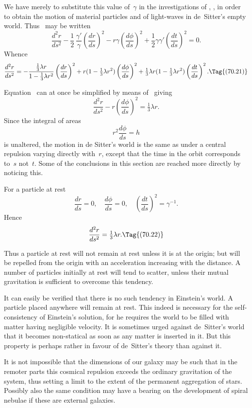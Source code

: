 \documentclass[12pt]{book}
\begin{document}
We have merely to substitute this value of~$\gamma$ in the investigations of
, , in order to obtain the motion of material particles and of light-waves
in de~Sitter's empty world. Thus ~may be written
\[
\frac{d^{2}r}{ds^{2}}
  - \frac{1}{2}\, \frac{\gamma'}{\gamma} \left(\frac{dr}{ds}\right)^{2}
  - r\gamma \left(\frac{d\phi}{ds}\right)^{2}
  + \frac{1}{2}\gamma\gamma' \left(\frac{dt}{ds}\right)^{2} = 0.
\]
Whence
\[
\frac{d^{2}r}{ds^{2}}
  = -\frac{\frac{1}{3}\lambda r}{1 - \frac{1}{3}\lambda r^{2}} \left(\frac{dr}{ds}\right)^{2}
  + r(1 - \tfrac{1}{3}\lambda r^{2}) \left(\frac{d\phi}{ds}\right)^{2}
  + \tfrac{1}{3}\lambda r(1 - \tfrac{1}{3}\lambda r^{2}) \left(\frac{dt}{ds}\right)^{2}.
  \Tag{(70.21)}
\]

Equation~ can at once be simplified by means of~ giving
\[
\frac{d^2 r}{ds^2} - r\left(\frac{d\phi}{ds}\right)^2 = \tfrac{1}{3}\lambda r.
\]
Since the integral of areas
\[
r^2\frac{d\phi}{ds} = h
\]
is unaltered, the motion in de Sitter's world is the same as under a central repulsion varying directly with~$r$,
except that the time in the orbit corresponds to~$s$ not~$t$.
Some of the conclusions in this section are reached more directly by noticing this.

For a particle at rest
\[
\frac{dr}{ds} = 0,\quad
\frac{d\phi}{ds} = 0,\quad
\left(\frac{dt}{ds}\right)^{2} = \gamma^{-1}.
\]
Hence
\[
\frac{d^{2}r}{ds^{2}} = \tfrac{1}{3}\lambda r.
\Tag{(70.22)}
\]

Thus a particle at rest will not remain at rest unless it is at the origin;
but will be repelled from the origin with an acceleration increasing with the
distance. A number of particles initially at rest will tend to scatter, unless
their mutual gravitation is sufficient to overcome this tendency.

It can easily be verified that there is no such tendency in Einstein's world.
A particle placed anywhere will remain at rest. This indeed is necessary for
the self-consistency of Einstein's solution, for he requires the world to be
filled with matter having negligible velocity. It is sometimes urged against
de~Sitter's world that it becomes non-statical as soon as any matter is inserted
in it. But this property is perhaps rather in favour of de~Sitter's theory than
against it.

It is not impossible that the dimensions of our galaxy may be such that in the remoter parts this cosmical
repulsion exceeds the ordinary gravitation of the system, thus setting a limit to the extent of the permanent
aggregation of stars.
Possibly also the same condition may have a bearing on the development of spiral nebulae if these are external
galaxies.
\end{document}
